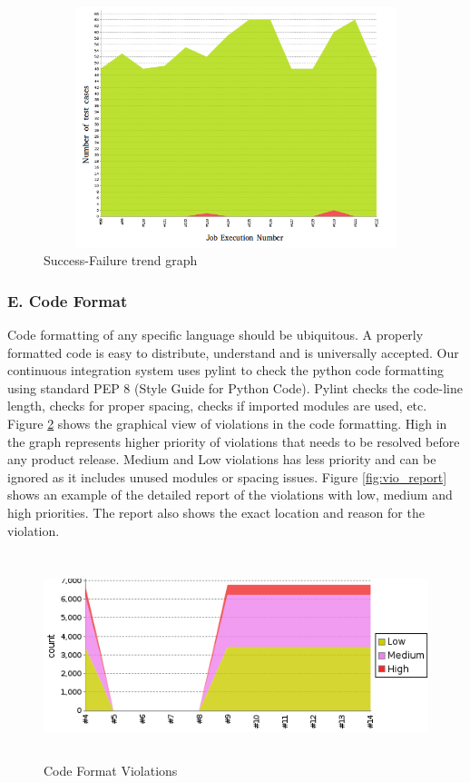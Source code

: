 \documentclass[10pt]{ruthesis}
\begin{document}
\label{}
\begin{figure}
 \begin{center}
  \includegraphics[width=15cm,height=7cm]{trends.png}
  \caption{Success-Failure trend graph}
  \label{fig:trend}
  \end{center}
\end{figure}

\subsubsection{\textbf{E. Code Format}}
Code formatting of any specific language should be ubiquitous. A properly formatted code is easy to distribute, understand and is universally accepted. Our continuous integration system uses pylint to check the python code formatting using standard PEP 8 (Style Guide for Python Code). Pylint checks the code-line length, checks for proper spacing, checks if imported modules are used, etc. Figure \ref{fig:violation} shows the graphical view of violations in the code formatting. High in the graph represents higher priority of violations that needs to be resolved before any product release. Medium and Low violations has less priority and can be ignored as it includes unused modules or spacing issues. Figure \ref{fig:vio_report} shows an example of the detailed report of the violations with low, medium and high priorities. The report also shows the exact location and reason for the violation.

\label{}
\begin{figure}
 \begin{center}
  \includegraphics[width=15cm,height=6cm]{violation.png}
  \caption{Code Format Violations}
  \label{fig:violation}
  \end{center}
\end{figure}
\end{document}
